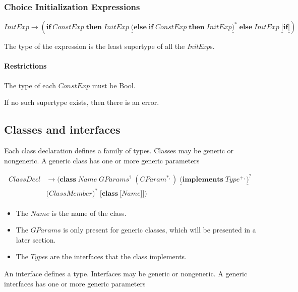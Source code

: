 \documentclass{article}%
\begin{document}
\subsubsection{Choice Initialization Expressions}%

\[
\mathit{InitExp}\rightarrow\left(  \mathbf{if}~\mathit{ConstExp}%
\;\mathbf{then}\;\mathit{InitExp}\;\underline{(}\mathbf{else\;if}%
\;\mathit{ConstExp}\;\mathbf{then}\;\mathit{InitExp}\underline{)}^{\ast
}\;\mathbf{else}\;\mathit{InitExp}\;\underline{[}\mathbf{if}\underline{]}%
\right)
\]


The type of the expression is the least supertype of all the \textit{InitExp}s.

\paragraph{Restrictions}

The type of each $\mathit{ConstExp}$ must be Bool.

If no such supertype exists, then there is an error.

\subsection{Classes and interfaces}

Each class declaration defines a family of types. Classes may be generic or
nongeneric. A generic class has one or more generic parameters%

\begin{align*}
ClassDecl  &  \rightarrow(\mathbf{class}\;Name\;GParams^{?}\;(CParam^{\ast
,})\;\underline{(}\mathbf{implements}\;Type^{+,}\underline{)}^{?}\mathbf{\;}\\
&  \underline{(}ClassMember\underline{)}^{\ast}\;\underline{[}\mathbf{class~}%
\underline{[}Name\underline{]}\underline{])}%
\end{align*}


\begin{itemize}
\item The $Name$ is the name of the class.

\item The $GParams$ is only present for generic classes, which will be
presented in a later section.

\item The $Type$s are the interfaces that the class implements.
\end{itemize}

An interface defines a type. Interfaces may be generic or nongeneric. A
generic interfaces has one or more generic parameters%
\end{document}
